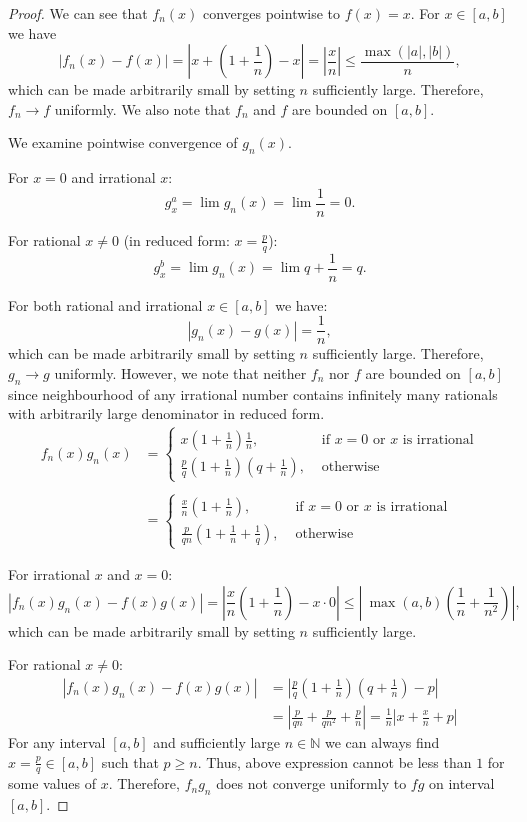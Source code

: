 \documentclass{article}
\newcommand{\N}{\mathbb{N}}
\begin{document}
\begin{proof}

We can see that $f_n(x)$ converges pointwise to $f(x) = x$. For $x \in [a,b]$ we have
\[ | f_n(x) - f(x) | = \left| x + \left( 1+\frac{1}{n} \right) - x \right| = \left| \frac{x}{n} \right| \leq \frac{\max(|a|,|b|)}{n}, \]
which can be made arbitrarily small by setting $n$ sufficiently large. 
Therefore, $f_n \to f$ uniformly. We also note that $f_n$ and $f$ are bounded on $[a,b]$.

We examine pointwise convergence of $g_n(x)$.

For $x=0$ and irrational $x$:
\[ g^a_x = \lim g_n(x) = \lim \frac{1}{n} = 0. \]

For rational $x \neq 0$ (in reduced form: $x = \frac{p}{q}$):
\[ g^b_x = \lim g_n(x) = \lim q+\frac{1}{n} = q. \]

For both rational and irrational $x \in [a,b]$ we have:
\[ |g_n(x) - g(x)| = \frac{1}{n}, \]
which can be made arbitrarily small by setting $n$ sufficiently large. 
Therefore, $g_n \to g$ uniformly. However, we note that neither $f_n$ nor $f$ are bounded on $[a,b]$ since neighbourhood of any irrational number contains infinitely many rationals with arbitrarily large denominator in reduced form.
\[
\begin{aligned}
    f_n(x) g_n(x) 
    & =
    \begin{cases}
        x \left( 1+\frac{1}{n} \right) \frac{1}{n}, & \text{ if $x=0$ or $x$ is irrational} \\
        \frac{p}{q} \left( 1+\frac{1}{n} \right) (q+\frac{1}{n}), & \text{ otherwise}
    \end{cases} \\\\
    & =
    \begin{cases}
        \frac{x}{n} \left( 1+\frac{1}{n} \right), & \text{ if $x=0$ or $x$ is irrational} \\
        \frac{p}{qn} \left( 1+\frac{1}{n}+\frac{1}{q} \right), & \text{ otherwise}
    \end{cases}
\end{aligned}
\]

For irrational $x$ and $x=0$:
\[ |f_n(x) g_n(x) - f(x) g(x) | = \left| \frac{x}{n} \left( 1+\frac{1}{n} \right) - x \cdot 0 \right| \leq \left| \> \max(a,b) \left( \frac{1}{n}+\frac{1}{n^2} \right) \right|, \]
which can be made arbitrarily small by setting $n$ sufficiently large.

For rational $x \neq 0$:
\begin{align*}
    |f_n(x) g_n(x) - f(x) g(x) | & = \left| \frac{p}{q} \left( 1+\frac{1}{n} \right) \left( q+\frac{1}{n} \right) - p \right| \\
    & = \left| \frac{p}{qn} + \frac{p}{qn^2} + \frac{p}{n} \right| = \frac{1}{n} \left| x + \frac{x}{n} + p \right|
\end{align*}
For any interval $[a,b]$ and sufficiently large $n\in\N$ we can always find $x=\frac{p}{q} \in [a,b]$ such that $p \geq n$.
Thus, above expression cannot be less than $1$ for some values of $x$. 
Therefore, $f_n g_n$ does not converge uniformly to $f g$ on interval $[a,b]$.

\end{proof}
\end{document}
